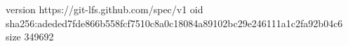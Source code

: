 version https://git-lfs.github.com/spec/v1
oid sha256:adeded7fde866b558fcf7510c8a0c18084a89102bc29e246111a1c2fa92b04c6
size 349692
